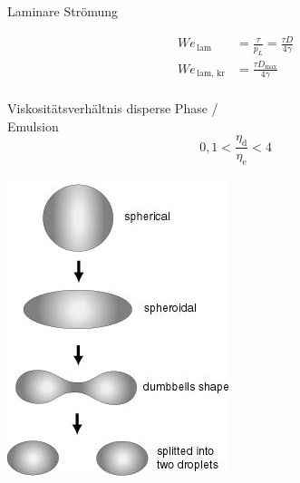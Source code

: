 \documentclass{beamer} %
\newcommand{\tx}[1]{\textrm{#1}}
\begin{document}
\begin{frame}{Laminare Strömung}
	\begin{minipage}{0.7\linewidth}
		\begin{equation*}
		\begin{aligned}
		We_{\,\tx{lam}} &= \frac{\tau}{p_L} = \frac{\tau D}{4 \gamma} \\
		We_{\,\tx{lam, kr}} &= \frac{\tau D_{\tx{max}}}{4 \gamma}
		\end{aligned}
		\end{equation*}
		\vspace{0.5cm}\\
		Viskositätsverhältnis disperse Phase / \\
		Emulsion
		\vspace{0.5cm}
		\begin{equation*}
		0,1 < \frac{\eta_{\tx{d}}}{\eta_{\tx{e}}} < 4
		\end{equation*}
	\end{minipage}%
	\begin{minipage}{0.3\linewidth}
		\includegraphics[width=\linewidth]{Markus/liquid_drop_E}
	\end{minipage}
\end{frame}
\end{document}
